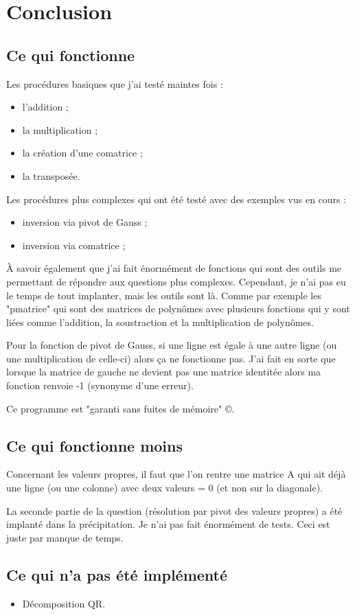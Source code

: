 \chapter{Conclusion}

\section{Ce qui fonctionne}

Les procédures basiques que j'ai testé maintes fois : 
\begin{itemize}
	\item l'addition ;
	\item la multiplication ;
	\item la création d'une comatrice ;
	\item la transposée.
\end{itemize}

Les procédures plus complexes qui ont été testé avec des exemples vus en cours :
\begin{itemize}
	\item inversion via pivot de Gauss ;
	\item inversion via comatrice ;
\end{itemize}

À savoir également que j'ai fait énormément de fonctions qui sont des outils me permettant de répondre aux questions plus complexes.
Cependant, je n'ai pas eu le temps de tout implanter, mais les outils sont là. 
Comme par exemple les "pmatrice" qui sont des matrices de polynômes avec plusieurs fonctions qui y sont liées comme l'addition, la soustraction et la multiplication de polynômes.

Pour la fonction de pivot de Gauss, si une ligne est égale à une autre ligne (ou une multiplication de celle-ci) alors ça ne fonctionne pas.
J'ai fait en sorte que lorsque la matrice de gauche ne devient pas une matrice identitée alors ma fonction renvoie -1 (synonyme d'une erreur).

Ce programme est "garanti sans fuites de mémoire" ©.

\section{Ce qui fonctionne moins}

Concernant les valeurs propres, il faut que l'on rentre une matrice A qui ait déjà une ligne (ou une colonne) avec deux valeurs = 0 (et non sur la diagonale).

La seconde partie de la question (résolution par pivot des valeurs propres) a été implanté dans la précipitation. Je n'ai pas fait énormément de tests.
Ceci est juste par manque de temps.

\section{Ce qui n'a pas été implémenté}
\begin{itemize}
	\item Décomposition QR.
\end{itemize}
